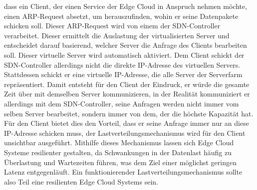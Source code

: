 dass ein Client, der einen Service der Edge Cloud in Anspruch nehmen möchte, einen \ac{ARP}-Request absetzt, um herauszufinden, wohin er seine Datenpakete schicken soll. 
Dieser \ac{ARP}-Request wird von einem der \ac{SDN}-Controller verarbeitet. Dieser ermittelt die Auslastung der virtualisierten Server und entscheidet darauf basierend, welcher Server die Anfrage des Clients bearbeiten soll. 
Dieser virtuelle Server wird automatisch aktiviert. Dem Client schickt der \ac{SDN}-Controller allerdings nicht die direkte \ac{IP}-Adresse des virtuellen Servers. Stattdessen schickt er eine virtuelle \ac{IP}-Adresse, 
die alle Server der Serverfarm repräsentiert. Damit entsteht für den Client der Eindruck, er würde die gesamte Zeit über mit demselben Server kommunizieren, in der Realität kommuniziert er allerdings mit dem \ac{SDN}-Controller, 
seine Anfragen werden nicht immer vom selben Server bearbeitet, sondern immer von dem, der die höchste Kapazität hat. Für den Client bietet dies den Vorteil, dass er seine Anfrage immer nur an diese \ac{IP}-Adresse schicken muss, 
der Lastverteilungsmechanismus wird für den Client unsichtbar ausgeführt. Mithilfe dieses Mechanismus lassen sich Edge Cloud Systeme resilienter gestalten, da Schwankungen in der Datenlast häufig zu Überlastung und Wartezeiten führen, 
was dem Ziel einer möglichst geringen Latenz entgegenläuft. Ein funktionierender Lastverteilungsmechanismus sollte also Teil eine resilienten Edge Cloud Systems sein.

